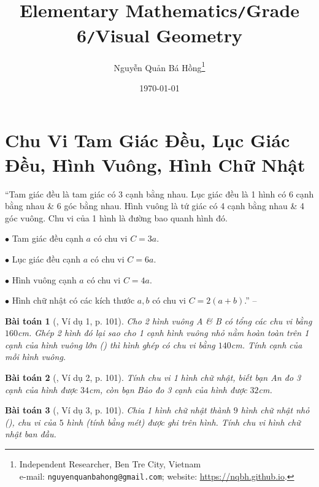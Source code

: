 \documentclass{article}
\title{Elementary Mathematics\texttt{/}Grade 6\texttt{/}Visual Geometry}
\author{Nguyễn Quản Bá Hồng\footnote{Independent Researcher, Ben Tre City, Vietnam\\e-mail: \texttt{nguyenquanbahong@gmail.com}; website: \url{https://nqbh.github.io}.}}
\date{\today}
\numberwithin{equation}{section}
\newtheorem{baitoan}{Bài toán}[section]
\begin{document}
\maketitle
\begin{abstract}
	
\end{abstract}
\setcounter{secnumdepth}{4}
\setcounter{tocdepth}{3}
\tableofcontents
\newpage


\section{Chu Vi Tam Giác Đều, Lục Giác Đều, Hình Vuông, Hình Chữ Nhật}
``Tam giác đều là tam giác có 3 cạnh bằng nhau. Lục giác đều là 1 hình có 6 cạnh bằng nhau \& 6 góc bằng nhau. Hình vuông là tứ giác có 4 cạnh bằng nhau \& 4 góc vuông. Chu vi của 1 hình là đường bao quanh hình đó.
\begin{enumerate*}
	\item[$\bullet$] Tam giác đều cạnh $a$ có chu vi $C = 3a$.
	\item[$\bullet$] Lục giác đều cạnh $a$ có chu vi $C = 6a$.
	\item[$\bullet$] Hình vuông cạnh $a$ có chu vi $C = 4a$.
	\item[$\bullet$] Hình chữ nhật có các kích thước $a,b$ có chu vi $C = 2(a + b)$.'' -- \cite[p. 101]{Binh_Toan_6_tap_1}
\end{enumerate*}

\begin{baitoan}[\cite{Binh_Toan_6_tap_1}, Ví dụ 1, p. 101]
	Cho 2 hình vuông A \& B có tổng các chu vi bằng $160$\emph{cm}. Ghép 2 hình đó lại sao cho 1 cạnh hình vuông nhỏ nằm hoàn toàn trên 1 cạnh của hình vuông lớn (\cite[Hình 18, p. 101]{Binh_Toan_6_tap_1}) thì hình ghép có chu vi bằng $140$\emph{cm}. Tính cạnh của mỗi hình vuông.
\end{baitoan}

\begin{baitoan}[\cite{Binh_Toan_6_tap_1}, Ví dụ 2, p. 101]
	Tính chu vi 1 hình chữ nhật, biết bạn An đo 3 cạnh của hình được $34$\emph{cm}, còn bạn Bảo đo 3 cạnh của hình được $32$\emph{cm}.
\end{baitoan}

\begin{baitoan}[\cite{Binh_Toan_6_tap_1}, Ví dụ 3, p. 101]
	Chia 1 hình chữ nhật thành $9$ hình chữ nhật nhỏ (\cite[Hình 19, p. 101]{Binh_Toan_6_tap_1}), chu vi của $5$ hình (tính bằng mét) được ghi trên hình. Tính chu vi hình chữ nhật ban đầu.
\end{baitoan}
\end{document}
